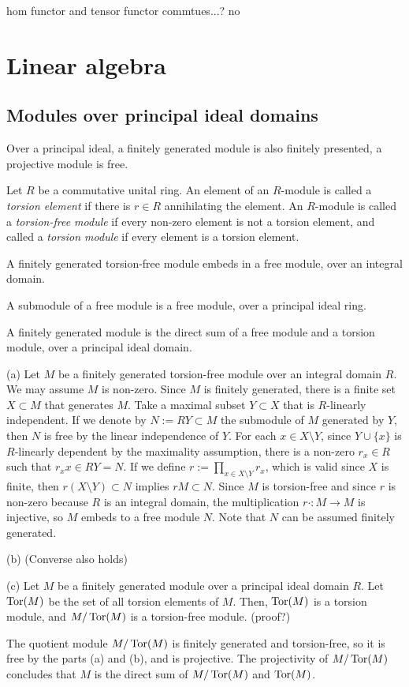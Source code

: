 \documentclass{../../large}
\begin{document}
hom functor and tensor functor commtues...? no




\chapter{Linear algebra}
\section{Modules over principal ideal domains}


Over a principal ideal, a finitely generated module is also finitely presented, a projective module is free.


\begin{prb}
Let $R$ be a commutative unital ring.
An element of an $R$-module is called a \emph{torsion element} if there is $r\in R$ annihilating the element.
An $R$-module is called a \emph{torsion-free module} if every non-zero element is not a torsion element, and called a \emph{torsion module} if every element is a torsion element.
\begin{parts}
\item A finitely generated torsion-free module embeds in a free module, over an integral domain.
\item A submodule of a free module is a free module, over a principal ideal ring.
\item A finitely generated module is the direct sum of a free module and a torsion module, over a principal ideal domain.
\end{parts}
\end{prb}
\begin{pf}
(a)
Let $M$ be a finitely generated torsion-free module over an integral domain $R$.
We may assume $M$ is non-zero.
Since $M$ is finitely generated, there is a finite set $X\subset M$ that generates $M$.
Take a maximal subset $Y\subset X$ that is $R$-linearly independent.
If we denote by $N:=RY\subset M$ the submodule of $M$ generated by $Y$, then $N$ is free by the linear independence of $Y$.
For each $x\in X\setminus Y$, since $Y\cup\{x\}$ is $R$-linearly dependent by the maximality assumption, there is a non-zero $r_x\in R$ such that $r_xx\in RY=N$.
If we define $r:=\prod_{x\in X\setminus Y}r_x$, which is valid since $X$ is finite, then $r(X\setminus Y)\subset N$ implies $rM\subset N$.
Since $M$ is torsion-free and since $r$ is non-zero because $R$ is an integral domain, the multiplication $r\cdot:M\to M$ is injective, so $M$ embeds to a free module $N$.
Note that $N$ can be assumed finitely generated.

(b)
(Converse also holds)


(c)
Let $M$ be a finitely generated module over a principal ideal domain $R$.
Let $\operatorname{Tor}(M)$ be the set of all torsion elements of $M$.
Then, $\operatorname{Tor}(M)$ is a torsion module, and $M/\operatorname{Tor}(M)$ is a torsion-free module. (proof?)

The quotient module $M/\operatorname{Tor}(M)$ is finitely generated and torsion-free, so it is free by the parts (a) and (b), and is projective.
The projectivity of $M/\operatorname{Tor}(M)$ concludes that $M$ is the direct sum of $M/\operatorname{Tor}(M)$ and $\operatorname{Tor}(M)$.

\end{pf}
\end{document}
